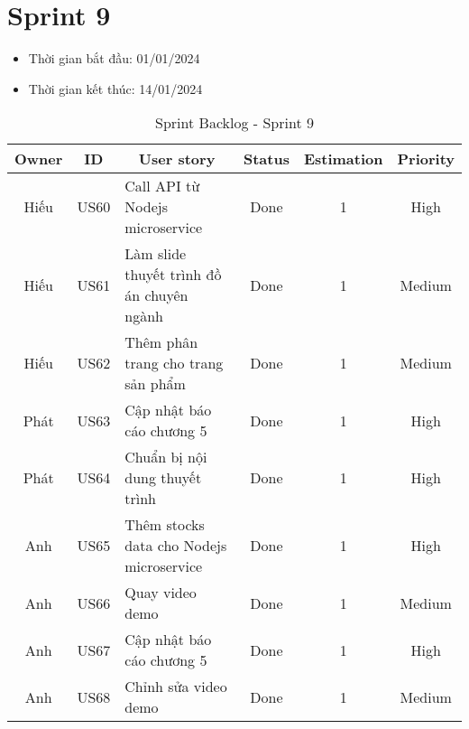 \section{Sprint 9}
\begin{itemize}
    \item Thời gian bắt đầu: 01/01/2024
    \item Thời gian kết thúc: 14/01/2024
\end{itemize}
\begin{table}[H]
    \begin{tabular}{|c|c|m{6cm}|c|c|c|}
    \hline
    \textbf{Owner} & \textbf{ID} & \multicolumn{1}{c|}{\textbf{User story}}                                & \textbf{Status} & \textbf{Estimation} & \textbf{Priority} \\ \hline
    Hiếu         & US60        & Call API từ Nodejs microservice                    & Done            & 1                   & High         \\ \hline
    Hiếu        & US61        & Làm slide thuyết trình đồ án chuyên ngành                    & Done            & 1                   & Medium         \\ \hline
    Hiếu         & US62        & Thêm phân trang cho trang sản phẩm                    & Done            & 1                   & Medium         \\ \hline
    Phát         & US63        & Cập nhật báo cáo chương 5                    & Done            & 1                   & High        \\ \hline
    Phát         & US64        & Chuẩn bị nội dung thuyết trình                    & Done            & 1                   & High        \\ \hline
    Anh         & US65        & Thêm stocks data cho Nodejs microservice                   & Done            & 1                   & High        \\ \hline
    Anh         & US66        & Quay video demo                   & Done            & 1                   & Medium         \\ \hline
    Anh         & US67        & Cập nhật báo cáo chương 5                   & Done            & 1                   & High        \\ \hline
    Anh         & US68        & Chỉnh sửa video demo                   & Done            & 1                   & Medium         \\ \hline
    \end{tabular}
    \caption{Sprint Backlog - Sprint 9}
    \label{tab:sprint-9}
\end{table}
